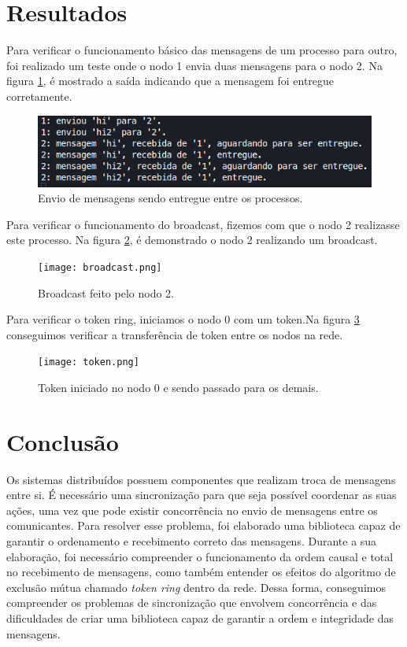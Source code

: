 \documentclass[
	12pt,				%
	openright,			%
	oneside,			%
	a4paper,			%
	english,			%
	french,				%
	spanish,			%
	brazil				%
	]{abntex2}
\begin{document}
\section{Resultados}
Para verificar o funcionamento básico das mensagens de um processo para outro,
foi realizado um teste onde o nodo 1 envia
duas mensagens para o nodo 2. Na figura \ref{fig:confirmado}, é mostrado a saída
indicando que a mensagem foi entregue corretamente.

\begin{figure}[!h]
    \centering
    \includegraphics[scale=0.9]{confirmado.png}
    \caption{Envio de mensagens sendo entregue entre os processos.}
    \label{fig:confirmado}
\end{figure}

Para verificar o funcionamento do broadcast, fizemos com que o nodo 2
realizasse este processo. Na figura \ref{fig:broadcast}, é demonstrado 
o nodo 2 realizando um broadcast.

\begin{figure}[!h]
    \centering
    \texttt{[image: broadcast.png]}
    \caption{Broadcast feito pelo nodo 2.}
    \label{fig:broadcast}
\end{figure}

Para verificar o token ring, iniciamos o nodo 0 com um token.Na figura \ref{fig:token}
conseguimos verificar a transferência de token entre os nodos na rede. 

\begin{figure}[!h]
    \centering
    \texttt{[image: token.png]}
    \caption{Token iniciado no nodo 0 e sendo passado para os demais.}
    \label{fig:token}
\end{figure}

\section{Conclusão}
Os sistemas distribuídos possuem componentes que realizam troca de mensagens entre si.
É necessário uma sincronização para que seja possível coordenar as suas ações,
uma vez que pode existir concorrência no envio de mensagens entre os comunicantes.
Para resolver esse problema, foi elaborado uma biblioteca capaz de garantir o ordenamento
e recebimento correto das mensagens. Durante a sua elaboração, foi necessário compreender
o funcionamento da ordem causal e total no recebimento de mensagens, como também 
entender os efeitos do algoritmo de exclusão mútua chamado \emph{token ring} dentro da rede.
Dessa forma, conseguimos compreender os problemas de sincronização que envolvem
concorrência e das dificuldades de criar uma biblioteca capaz de garantir a ordem e integridade das mensagens.
\end{document}
